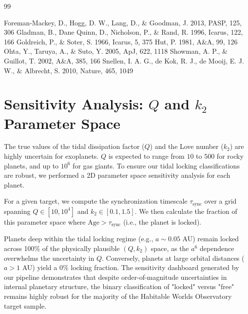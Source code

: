 \documentclass[a4paper,11pt]{article}
\numberwithin{equation}{section}
\begin{document}

\begin{thebibliography}{99}

 Foreman-Mackey, D., Hogg, D. W., Lang, D., \& Goodman, J. 2013, PASP, 125, 306
 Gladman, B., Dane Quinn, D., Nicholson, P., \& Rand, R. 1996, Icarus, 122, 166
 Goldreich, P., \& Soter, S. 1966, Icarus, 5, 375
 Hut, P. 1981, A\&A, 99, 126
 Ohta, Y., Taruya, A., \& Suto, Y. 2005, ApJ, 622, 1118
 Showman, A. P., \& Guillot, T. 2002, A\&A, 385, 166
 Snellen, I. A. G., de Kok, R. J., de Mooij, E. J. W., \& Albrecht, S. 2010, Nature, 465, 1049

\end{thebibliography}

\newpage
\appendix
\section{Sensitivity Analysis: $Q$ and $k_2$ Parameter Space}
\label{app:sensitivity}

The true values of the tidal dissipation factor ($Q$) and the Love number ($k_2$) are highly uncertain for exoplanets. $Q$ is expected to range from $10$ to $500$ for rocky planets, and up to $10^6$ for gas giants. To ensure our tidal locking classifications are robust, we performed a 2D parameter space sensitivity analysis for each planet.

For a given target, we compute the synchronization timescale $\tau_{\text{sync}}$ over a grid spanning $Q \in [10, 10^4]$ and $k_2 \in [0.1, 1.5]$. We then calculate the fraction of this parameter space where $\text{Age} > \tau_{\text{sync}}$ (i.e., the planet is locked). 

Planets deep within the tidal locking regime (e.g., $a \sim 0.05$ AU) remain locked across 100\% of the physically plausible $(Q, k_2)$ space, as the $a^6$ dependence overwhelms the uncertainty in $Q$. Conversely, planets at large orbital distances ($a > 1$ AU) yield a 0\% locking fraction. The sensitivity dashboard generated by our pipeline demonstrates that despite order-of-magnitude uncertainties in internal planetary structure, the binary classification of "locked" versus "free" remains highly robust for the majority of the Habitable Worlds Observatory target sample.
\end{document}
